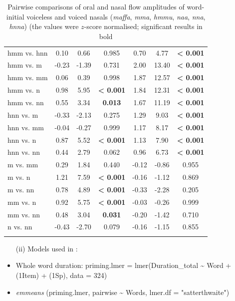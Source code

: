 \documentclass[output=paper]{langscibook}
\begin{document}
\begin{paperappendix}
\begin{table}[H]
\begin{tabular}{l *2 {S[table-format=-.2] S[table-format=-1.2] S[table-format=<1.3]}}
		hmm vs. hnn & 0.10 & 0.66 & 0.985 & 0.70 & 4.77 & \bfseries < 0.001\\
		hmm vs. m & -0.23 & -1.39 & 0.731 & 2.00 & 13.40 & \bfseries < 0.001\\
		hmm vs. mm & 0.06 & 0.39 & 0.998 & 1.87 & 12.57 & \bfseries < 0.001\\
		hmm vs. n & 0.98 & 5.95 & \bfseries < 0.001 & 1.84 & 12.31 & \bfseries < 0.001\\
		hmm vs. nn & 0.55 & 3.34 & \bfseries 0.013 & 1.67 & 11.19 & \bfseries < 0.001\\
		hnn vs. m & -0.33 & -2.13 & 0.275 & 1.29 & 9.03 & \bfseries < 0.001\\
		hnn vs. mm & -0.04 & -0.27 & 0.999 & 1.17 & 8.17 & \bfseries < 0.001\\
		hnn vs. n & 0.87 & 5.52 & \bfseries < 0.001 & 1.13 & 7.90 & \bfseries < 0.001\\
		hnn vs. nn & 0.44 & 2.79 & 0.062 & 0.96 & 6.73 & \bfseries < 0.001\\
		m vs. mm & 0.29 & 1.84 & 0.440 & -0.12 & -0.86 & 0.955\\
		m vs. n & 1.21 & 7.59 & \bfseries < 0.001 & -0.16 & -1.12 & 0.869\\
		m vs. nn & 0.78 & 4.89 & \bfseries < 0.001 & -0.33 & -2.28 & 0.205\\
		mm vs. n & 0.92 & 5.75 & \bfseries < 0.001 & -0.03 & -0.26 & 0.999\\
		mm vs. nn & 0.48 & 3.04 & \bfseries 0.031 & -0.20 & -1.42 & 0.710\\
		n vs. nn & -0.43 & -2.70 & 0.079 & -0.16 & -1.15 & 0.855\\
		\lspbottomrule
	\end{tabular}
	\caption{Pairwise comparisons of oral and nasal flow amplitudes of word-initial voiceless and voiced nasals (\emph{maffa}, \emph{mma}, \emph{hmmu}, \emph{naa}, \emph{nna}, \emph{hnna}) (the values were $z$-score normalised; significant results in bold}
	\label{tab:13:sm1}
	\end{table}


\begin{itemize}
\item[(ii)] Models used in :
\item
Whole word duration:
priming.lmer = lmer(Duration\_total {\textasciitilde} Word + (1{\textbar}Item) + (1{\textbar}Sp), data = 324)
\item
\textit{emmeans} (priming.lmer, pairwise {\textasciitilde} Words, lmer.df = "satterthwaite")
\end{itemize}


\end{paperappendix}
\end{document}
